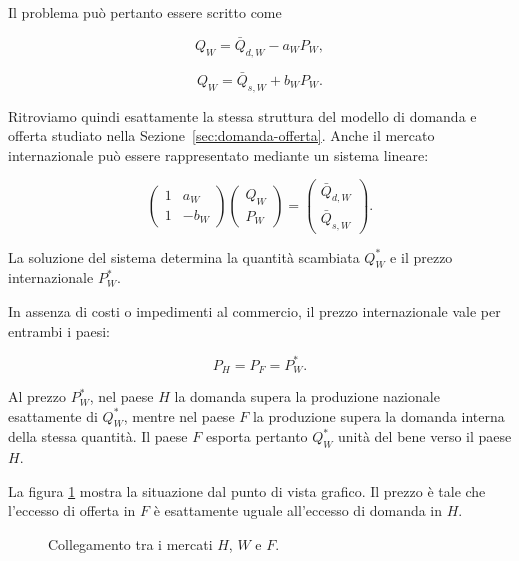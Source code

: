 Il problema può pertanto essere scritto come

\begin{equation*}
    Q_W=\bar{Q}_{d,W}-a_WP_W,
\end{equation*}

\begin{equation*}
    Q_W=\bar{Q}_{s,W}+b_WP_W.
\end{equation*}

Ritroviamo quindi esattamente la stessa struttura del modello di
domanda e offerta studiato nella Sezione~\ref{sec:domanda-offerta}.
Anche il mercato internazionale può essere rappresentato mediante
un sistema lineare:

\begin{equation*}
    \begin{pmatrix}
        1 & a_W\\
        1 & -b_W
    \end{pmatrix}
    \begin{pmatrix}
        Q_W\\
        P_W
    \end{pmatrix}
    =
    \begin{pmatrix}
        \bar{Q}_{d,W}\\
        \bar{Q}_{s,W}
    \end{pmatrix}.
    \label{eq:sistema-mercato-internazionale}
\end{equation*}

La soluzione del sistema determina la quantità scambiata
$Q_W^*$ e il prezzo internazionale $P_W^*$.

In assenza di costi o impedimenti al commercio, il prezzo
internazionale vale per entrambi i paesi:

\begin{equation*}
    P_H=P_F=P_W^*.
\end{equation*}

Al prezzo $P_W^*$, nel paese $H$ la domanda supera la produzione
nazionale esattamente di $Q_W^*$, mentre nel paese $F$ la produzione
supera la domanda interna della stessa quantità. Il paese $F$
esporta pertanto $Q_W^*$ unità del bene verso il paese $H$.

La figura \ref{fig:mercati_HWF} mostra la situazione dal punto di vista grafico. Il prezzo è tale che l'eccesso di offerta in $F$ è esattamente uguale all'eccesso di domanda in $H$.

\begin{figure}[ht]
\centering
\resizebox{\linewidth}{!}{%

}
\caption{Collegamento tra i mercati $H$, $W$ e $F$.}
\label{fig:mercati_HWF}
\end{figure}

